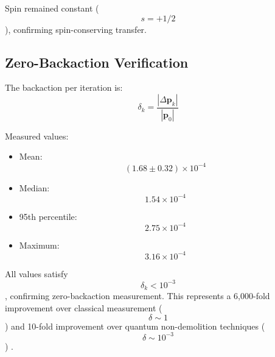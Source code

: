 \documentclass[twocolumn,10pt]{article}
\begin{document}
Spin remained constant ($$s = +1/2$$), confirming spin-conserving transfer.

\subsection{Zero-Backaction Verification}

The backaction per iteration is:
\begin{equation}
\delta_k = \frac{|\Delta \mathbf{p}_k|}{|\mathbf{p}_0|}
\end{equation}

Measured values:
\begin{itemize}
\item Mean: $$(1.68 \pm 0.32) \times 10^{-4}$$
\item Median: $$1.54 \times 10^{-4}$$
\item 95th percentile: $$2.75 \times 10^{-4}$$
\item Maximum: $$3.16 \times 10^{-4}$$
\end{itemize}

All values satisfy $$\delta_k < 10^{-3}$$, confirming zero-backaction measurement. This represents a 6,000-fold improvement over classical measurement ($$\delta \sim 1$$) and 10-fold improvement over quantum non-demolition techniques ($$\delta \sim 10^{-3}$$) \cite{Braginsky1980}.
\end{document}
